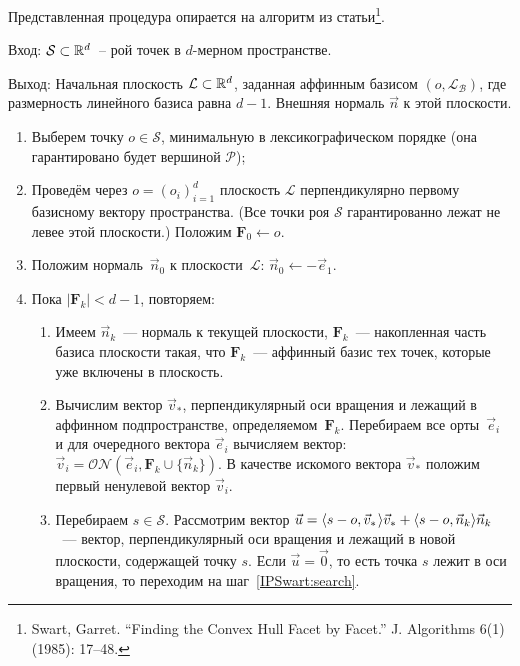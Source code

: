 \documentclass[a4paper,12pt]{article}
\newcommand{\R}[1][]{%
  \ifthenelse{\equal{#1}{}}%
  {\mathbb{R}}%
  {\mathbb{R}^{#1}}}
\newcommand{\Swarm}{\mathcal{S}}              %
\newcommand{\Polytop}{\mathcal{P}}         %
\newcommand{\Basis}{\mathcal{B}}              %
\newcommand{\ZVec}{\vec 0}                    %
\newcommand{\set}[2][]{#1\{ #2 #1\}}                    %
\newcommand{\scalprod}[3][]{#1\langle #2, #3 #1\rangle} %
\newcommand{\ONorm}[3][]{\mathcal{ON}#1( #2, #3 #1)} %
\newcommand{\FinalVec}{\mathbf{F}} %
\newcommand{\Plane}{\mathcal{L}}           %
\renewcommand{\.}{\hspace{0.2ex}}
\begin{document}
    Представленная процедура опирается на алгоритм из статьи\footnote{Swart, Garret. ``Finding the Convex Hull Facet by Facet.'' J. Algorithms 6(1) (1985): 17--48.}.

    Вход: $\Swarm \subset \R[d]$~-- рой точек в $d$-мерном пространстве.

    Выход: Начальная плоскость $\Plane \subset \R[d]$, заданная аффинным базисом $(o,\Plane_\Basis)$, где размерность линейного базиса равна $d-1$. Внешняя нормаль $\vec n$ к этой плоскости.

    \begin{enumerate}
      \item Выберем точку $o \in \Swarm$, минимальную в лексикографическом порядке (она гарантировано будет вершиной $\Polytop$);


      \item Проведём через $o=(o_i)_{i = 1}^{d}$ плоскость $\Plane$ перпендикулярно первому базисному вектору пространства. (Все точки роя $\Swarm$ гарантированно лежат не левее этой плоскости.) Положим $\FinalVec_0 \leftarrow o$.


      \item Положим нормаль~$\vec n_0$ к плоскости~$\Plane$: $\vec n_0 \leftarrow -\vec e_1$.


      \item Пока $|\FinalVec_k| < d - 1$, повторяем:


      \begin{enumerate}
        \item Имеем $\vec n_k$~--- нормаль к текущей плоскости, $\FinalVec_k$~--- накопленная часть базиса плоскости такая, что $\FinalVec_k$~--- аффинный базис тех точек, которые уже включены в плоскость.


        \item Вычислим вектор $\vec v_*$, перпендикулярный оси вращения и лежащий в аффинном подпространстве, определяемом~$\FinalVec_k$. Перебираем все орты~$\vec e_i$ и для очередного вектора $\vec e_i$ вычисляем вектор: $\vec v_i = \ONorm{\vec e_i}{\FinalVec_k \cup \set{\vec n_k}}$. В качестве искомого вектора $\vec v_*$ положим первый ненулевой вектор $\vec v_i$.


        \item Перебираем $s \in \Swarm$. Рассмотрим вектор $\vec u = \scalprod{s - o}{\vec v_* \.}\vec v_* + \scalprod{s - o}{\vec n_k}\vec n_k$~--- вектор, перпендикулярный оси вращения и лежащий в новой плоскости, содержащей точку $s$. Если $\vec u = \ZVec$, то есть точка $s$ лежит в оси вращения, то переходим на шаг~\ref{IPSwart:search}.
        \label{IPSwart:search}



\end{enumerate}
\end{enumerate}
\end{document}
